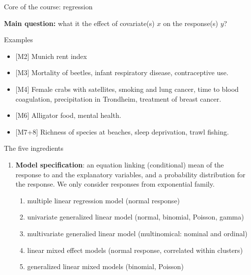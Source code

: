 \documentclass[ignorenonframetext,]{beamer}
\providecommand{\tightlist}{%
  \setlength{\itemsep}{0pt}\setlength{\parskip}{0pt}}
\begin{document}
\begin{frame}{Core of the course: regression}

\textbf{Main question:} what it the effect of covariate(s) \(x\) on the
response(s) \(y\)?

\begin{block}{Examples}

\begin{itemize}
\tightlist
\item
  {[}M2{]} Munich rent index
\item
  {[}M3{]} Mortality of beetles, infant respiratory disease,
  contraceptive use.
\item
  {[}M4{]} Female crabs with satellites, smoking and lung cancer, time
  to blood coagulation, precipitation in Trondheim, treatment of breast
  cancer.
\item
  {[}M6{]} Alligator food, mental health.
\item
  {[}M7+8{]} Richness of species at beaches, sleep deprivation, trawl
  fishing.
\end{itemize}

\end{block}

\end{frame}

\begin{frame}

\begin{block}{The five ingredients}

\begin{enumerate}
\def\labelenumi{\arabic{enumi}.}
\tightlist
\item
  \textbf{Model specification}: an equation linking (conditional) mean
  of the response to and the explanatory variables, and a probability
  distribution for the response. We only consider responses from
  exponential family.

  \begin{enumerate}
  \def\labelenumii{\alph{enumii}.}
  \tightlist
  \item
    multiple linear regression model (normal response)
  \item
    univariate generalized linear model (normal, binomial, Poisson,
    gamma)
  \item
    multivariate generalied linear model (multinomical: nominal and
    ordinal)
  \item
    linear mixed effect models (normal response, correlated within
    clusters)
  \item
    generalized linear mixed models (binomial, Poisson)
  \end{enumerate}
\end{enumerate}

\end{block}

\end{frame}
\end{document}
